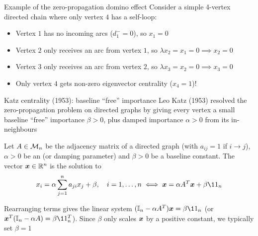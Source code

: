 \documentclass[aspectratio=169]{beamer}\usepackage[]{graphicx}\usepackage[]{xcolor}
\begin{document}
\begin{frame}{Example of the zero-propagation domino effect}
Consider a simple 4-vertex directed chain where only vertex $4$ has a self-loop:
\vfill
\begin{center}
\end{center}
\vfill
\begin{itemize}
\item Vertex $1$ has no incoming arcs ($d_1^- = 0$), so $x_1 = 0$
\item Vertex $2$ only receives an arc from vertex $1$, so $\lambda x_2 = x_1 = 0 \implies x_2 = 0$
\item Vertex $3$ only receives an arc from vertex $2$, so $\lambda x_3 = x_2 = 0 \implies x_3 = 0$
\item Only vertex $4$ gets non-zero eigenvector centrality ($x_4 = 1$)!
\end{itemize}
\end{frame}

\begin{frame}{Katz centrality (1953): baseline ``free'' importance}
Leo Katz (1953) resolved the zero-propagation problem on directed graphs by giving every vertex a small baseline ``free'' importance $\beta > 0$, plus damped importance $\alpha > 0$ from its in-neighbours
\vfill
\begin{definition}
Let $A \in \mathcal{M}_n$ be the adjacency matrix of a directed graph (with $a_{ij} = 1$ if $i \to j$), $\alpha > 0$ be an  (or damping parameter) and $\beta > 0$ be a baseline constant. The  vector $\bm{x} \in \mathbb{R}^n$ is the solution to
\[
x_i = \alpha \sum_{j=1}^n a_{ji} x_j + \beta, \quad i=1,\ldots,n
\iff
\bx = \alpha A^T \bx + \beta \11_n
\]
\end{definition}
\vfill
Rearranging terms gives the linear system $(\II_n - \alpha A^T)\bx = \beta \11_n$ (or $\bx^T(\II_n - \alpha A) = \beta\11_n^T$). Since $\beta$ only scales $\bm{x}$ by a positive constant, we typically set $\beta = 1$
\end{frame}
\end{document}
